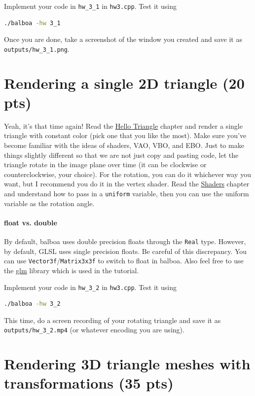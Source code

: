 Implement your code in \lstinline{hw_3_1} in \lstinline{hw3.cpp}. Test it using
\begin{lstlisting}[language=bash]
./balboa -hw 3_1
\end{lstlisting}

Once you are done, take a screenshot of the window you created and save it as \lstinline{outputs/hw_3_1.png}.

\section{Rendering a single 2D triangle (20 pts)}

Yeah, it's that time again! Read the \href{https://learnopengl.com/Getting-started/Hello-Triangle}{Hello Triangle} chapter and render a single triangle with constant color (pick one that you like the most). Make sure you've become familiar with the ideas of shaders, VAO, VBO, and EBO. Just to make things slightly different so that we are not just copy and pasting code, let the triangle rotate in the image plane over time (it can be clockwise or counterclockwise, your choice). For the rotation, you can do it whichever way you want, but I recommend you do it in the vertex shader. Read the \href{https://learnopengl.com/Getting-started/Shaders}{Shaders} chapter and understand how to pass in a \lstinline{uniform} variable, then you can use the uniform variable as the rotation angle.  

\paragraph{float vs. double} By default, balboa uses double precision floats through the \lstinline{Real} type. However, by default, GLSL uses single precision floats. Be careful of this discrepancy. You can use \lstinline{Vector3f}/\lstinline{Matrix3x3f} to switch to float in balboa. Also feel free to use the \href{https://github.com/g-truc/glm}{glm} library which is used in the tutorial.

Implement your code in \lstinline{hw_3_2} in \lstinline{hw3.cpp}. Test it using
\begin{lstlisting}[language=bash]
./balboa -hw 3_2
\end{lstlisting}

This time, do a screen recording of your rotating triangle and save it as \lstinline{outputs/hw_3_2.mp4} (or whatever encoding you are using).

\section{Rendering 3D triangle meshes with transformations (35 pts)}

